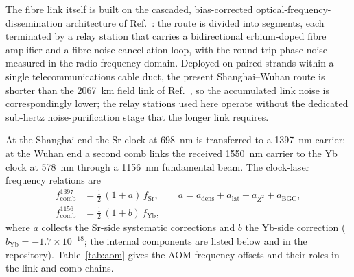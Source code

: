 \documentclass[11pt,a4paper]{article}
\newcommand{\e}[1]{\times 10^{#1}}
\begin{document}
The fibre link itself is built on the cascaded,
bias-corrected optical-frequency-dissemination architecture of
Ref.~\citep{chen2026dissemination}: the route is divided into segments,
each terminated by a relay station that carries a bidirectional
erbium-doped fibre amplifier and a fibre-noise-cancellation loop, with the
round-trip phase noise measured in the radio-frequency domain. Deployed
on paired strands within a single telecommunications cable duct, the
present Shanghai--Wuhan route is shorter than the \qty{2067}{km} field link of
Ref.~\citep{chen2026dissemination}, so the accumulated link noise is
correspondingly lower; the relay stations used here operate without the
dedicated sub-hertz noise-purification stage that the longer link
requires.

At the Shanghai end the Sr clock at \qty{698}{nm} is transferred to a
\qty{1397}{nm} carrier; at the Wuhan end a second comb links the received
\qty{1550}{nm} carrier to the Yb clock at \qty{578}{nm} through a \qty{1156}{nm}
fundamental beam. The clock-laser frequency relations are
\begin{align}
  f_{\mathrm{comb}}^{1397} &= \tfrac{1}{2}\,(1+a)\,f_{\mathrm{Sr}},
  \qquad a = a_{\mathrm{dens}} + a_{\mathrm{lat}} + a_{Z^2} + a_{\mathrm{BGC}}, \\
  f_{\mathrm{comb}}^{1156} &= \tfrac{1}{2}\,(1+b)\,f_{\mathrm{Yb}},
\end{align}
where $a$ collects the Sr-side systematic corrections \citep{jia2026sr} and
$b$ the Yb-side correction \citep{zhu2026yb} ($b_{\mathrm{Yb}} =
-1.7\e{-18}$; the internal components are listed below and in the
repository). Table~\ref{tab:aom} gives the AOM frequency offsets and
their roles in the link and comb chains.
\end{document}
